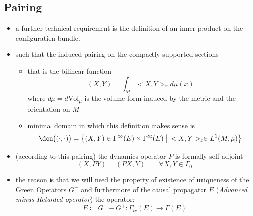 \documentclass[a4paper,11pt]{scrartcl}
\begin{document}
	\subsection{Pairing}
	\begin{itemize}
		\item a further technical requirement is the definition of an inner product on the configuration bundle.
		\item such that the induced pairing on the compactly supported sections
		\begin{itemize}
			\item 		that is the bilinear function
			$$ (X,Y) = \int_M <X,Y>_x d\mu(x)$$
   			where $d\mu = d\textrm{Vol}_\mu$ is the volume form induced by the metric and the orientation on $M$
			\item minimal domain in which this definition makes sense is
			$$ \dom\big( (\cdot, \cdot) \big) =
   					\big\{(X,Y) \in \Gamma^\infty(E) \times \Gamma^\infty(E) \; \big\vert \,  <X,Y>_x \in L^1(M,\mu)\big \} $$
		\end{itemize}
		\item (according to this pairing) the dynamics operator $P$  is formally self-adjoint
		$$(X,PY) = (PX,Y) \qquad \forall X,Y \in \Gamma_0$$
		\item the reason is that we will need the property of existence of uniqueness of the Green Operators $G^\pm$ and furthermore of the  causal propagator $E$ (\emph{Advanced minus Retarded operator}) the operator:
				$$
					E \coloneqq G^-  - G^+ : \Gamma_{tc}(E) \rightarrow \Gamma(E)
				$$
	\end{itemize}
		

	
\end{document}
